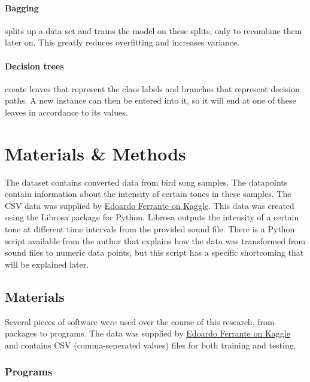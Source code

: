 \documentclass[
]{article}
\begin{document}
\hypertarget{bagging}{%
\paragraph{Bagging}\label{bagging}}

splits up a data set and trains the model on these splits, only to
recombine them later on. This greatly reduces overfitting and increases
variance.

\hypertarget{decision-trees}{%
\paragraph{Decision trees}\label{decision-trees}}

create leaves that represent the class labels and branches that
represent decision paths. A new instance can then be entered into it, so
it will end at one of these leaves in accordance to its values. \newpage

\hypertarget{materials-methods}{%
\section{Materials \& Methods}\label{materials-methods}}

The dataset contains converted data from bird song samples. The
datapoints contain information about the intensity of certain tones in
these samples. The CSV data was supplied by
\href{https://www.kaggle.com/datasets/fleanend/birds-songs-numeric-dataset}{Edoardo
Ferrante on Kaggle}. This data was created using the Librosa package for
Python. Librosa outputs the intensity of a certain tone at different
time intervals from the provided sound file. There is a Python script
available from the author that explains how the data was transformed
from sound files to numeric data points, but this script has a specific
shortcoming that will be explained later.

\hypertarget{materials}{%
\subsection{Materials}\label{materials}}

Several pieces of software were used over the course of this research,
from packages to programs. The data was supplied by
\href{https://www.kaggle.com/datasets/fleanend/birds-songs-numeric-dataset}{Edoardo
Ferrante on Kaggle} and contains CSV (comma-seperated values) files for
both training and testing.

\hypertarget{programs}{%
\subsubsection{Programs}\label{programs}}
\end{document}
